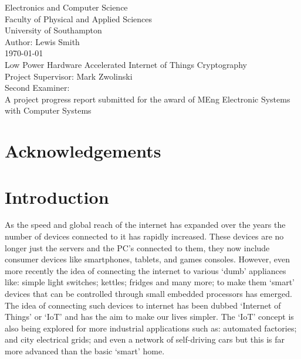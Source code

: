 \documentclass[12pt,twoside,a4paper]{report}
\begin{document}
    
    \begin{titlepage}
    \begin{center}
        \Huge
        Electronics and Computer Science
        \\Faculty of Physical and Applied Sciences
        \\University of Southampton
        \Large
        \\[4cm]Author: Lewis Smith
        \\[1cm]\today
        \\[2cm]Low Power Hardware Accelerated Internet of Things Cryptography
        \\[4cm]Project Supervisor: Mark Zwolinski
        \\Second Examiner:
        \\[4cm]A project progress report submitted for the award of MEng Electronic Systems with Computer Systems
        
    \end{center}
    \end{titlepage}
    \thispagestyle{empty}
    \cleardoublepage
    
    \begin{abstract}
    
    \lipsum[1-2]
    
    \end{abstract}
    
    \tableofcontents
    
    \chapter*{Acknowledgements}
    
    \chapter{Introduction}
    \label{chapter:intro}
    As the speed and global reach of the internet has expanded over the years the number of devices connected to it has rapidly increased. These devices are no longer just the servers and the PC's connected to them, they now include consumer devices like smartphones, tablets, and games consoles. However, even more recently the idea of connecting the internet to various `dumb' appliances like: simple light switches; kettles; fridges and many more; to make them `smart' devices that can be controlled through small embedded processors has emerged. The idea of connecting such devices to internet has been dubbed `Internet of Things' or `IoT' and has the aim to make our lives simpler. The `IoT' concept is also being explored for more industrial applications such as: automated factories; and city electrical grids; and even a network of self-driving cars\cite{Hegde} but this is far more advanced than the basic `smart' home.
    
\end{document}
